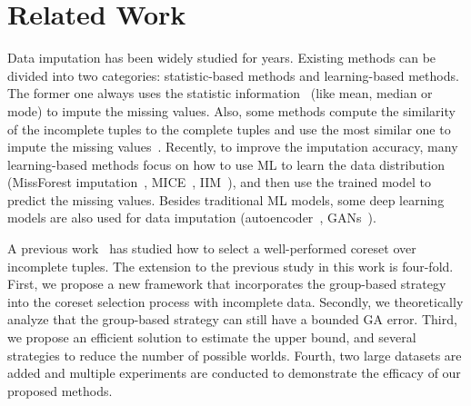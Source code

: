 \section{Related Work}\label{sec:related}

Data imputation has been widely studied for  years. Existing  methods can be divided into two categories: statistic-based methods and learning-based methods. The former one always uses the statistic information~\cite{DBLP:journals/tsmc/FarhangfarKP07, DBLP:conf/sigmod/MayfieldNP10} (like mean, median or mode) to impute the missing values. Also, some methods compute the similarity of the incomplete tuples to the complete tuples and use the most similar one to impute the missing values~\cite{altman1992introduction, DBLP:journals/artmed/JerezMGARMF10, DBLP:conf/isese/TwalaCS05}. Recently, to improve the imputation accuracy,   many learning-based methods focus on how to use ML to learn the data distribution (\eg MissForest imputation~\cite{DBLP:journals/bioinformatics/StekhovenB12}, MICE~\cite{royston2011multiple},  IIM~\cite{DBLP:conf/icde/ZhangSSW19}), and then  use the trained model to predict the missing values. Besides traditional ML models, some deep learning models are also used for data imputation (\eg  autoencoder~\cite{DBLP:journals/corr/GondaraW17, mccoy2018variational, DBLP:journals/pr/NazabalOGV20}, GANs~\cite{DBLP:journals/nn/SpinelliSU20, DBLP:conf/icml/YoonJS18}).
 
 A previous work~\cite{goodcore} has studied how to select a well-performed coreset over incomplete tuples. The extension to the previous study in this work is four-fold. First, we propose a new framework that incorporates the group-based strategy into the coreset selection process with incomplete data. Secondly, we theoretically analyze that the group-based strategy can still have a bounded GA error. Third, we propose an efficient solution to estimate the upper bound, and several strategies to reduce the number of possible worlds. Fourth, two large datasets are added and multiple experiments are conducted to demonstrate the efficacy of our proposed methods. 


